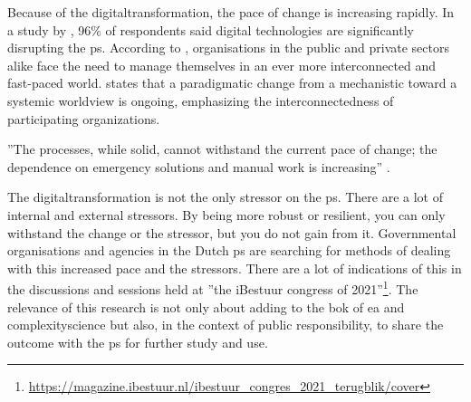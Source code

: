 Because of the \gls{digitaltransformation}, the pace of change is increasing rapidly. In a study by \textcite{Eggers2015}, 96\% of respondents said digital technologies are significantly disrupting the \gls{ps}. According to \textcite{Nurmi2021}, organisations in the public and private sectors alike face the need to manage themselves in an ever more interconnected and fast-paced world. \textcite{Guggenberger2020} states that a paradigmatic change from a mechanistic toward a systemic worldview is ongoing, emphasizing the interconnectedness of participating organizations. 

\begin{remark}
	''The processes, while solid, cannot withstand the current pace of change; the dependence on emergency solutions and manual work is increasing'' \parencite[p.~2]{Wiebes2014}.
\end{remark}

The \gls{digitaltransformation} is not the only \gls{stressor} on the \gls{ps}. There are a lot of internal and external \glspl{stressor}. By being more \gls{robust} or \gls{resilient}, you can only withstand the change or the \gls{stressor}, but you do not gain from it. Governmental organisations and agencies in the Dutch \gls{ps} are searching for methods of dealing with this increased pace and the stressors. There are a lot of indications of this in the discussions and sessions held at ''the iBestuur congress of 2021''\footnote{\url{https://magazine.ibestuur.nl/ibestuur_congres_2021_terugblik/cover}}. The relevance of this research is not only about adding to the \acrshort{bok} of \acrshort{ea} and \gls{complexityscience} but also, in the context of public responsibility, to share the outcome with the \gls{ps} for further study and use.
